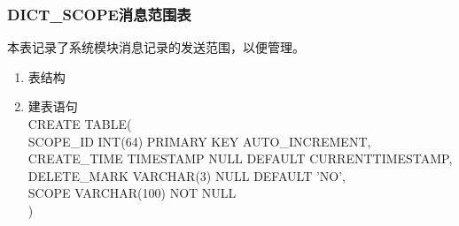 \subsubsection{DICT\_SCOPE消息范围表}
本表记录了系统模块消息记录的发送范围，以便管理。
\begin{enumerate}
    \item 表结构
    \begin{table}[htbp]
        \centering
        \end{table}
    \item 建表语句\\
        CREATE TABLE(\\
            SCOPE\_ID INT(64) PRIMARY KEY AUTO\_INCREMENT,\\
            CREATE\_TIME TIMESTAMP NULL DEFAULT CURRENTTIMESTAMP,\\
            DELETE\_MARK VARCHAR(3) NULL DEFAULT 'NO',\\
            SCOPE VARCHAR(100) NOT NULL\\
        )
    \end{enumerate}




